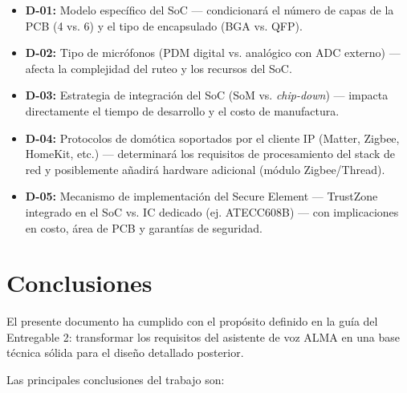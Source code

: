 \documentclass[%
	paper=a4,
	twoside=false,
	parskip=half,
	chapterprefix=false,
	10pt,
	headings=normal,
	bibliography=totoc,
	listof=totoc,
	titlepage=on,
	captions=tableabove,
	draft=false,
]{scrbook}%
\begin{document}
\begin{itemize}
    \item \textbf{D-01:} Modelo específico del SoC — condicionará el número de capas de la PCB (4 vs. 6) y el tipo de encapsulado (BGA vs. QFP).
    \item \textbf{D-02:} Tipo de micrófonos (PDM digital vs. analógico con ADC externo) — afecta la complejidad del ruteo y los recursos del SoC.
    \item \textbf{D-03:} Estrategia de integración del SoC (SoM vs. \textit{chip-down}) — impacta directamente el tiempo de desarrollo y el costo de manufactura.
    \item \textbf{D-04:} Protocolos de domótica soportados por el cliente IP (Matter, Zigbee, HomeKit, etc.) — determinará los requisitos de procesamiento del stack de red y posiblemente añadirá hardware adicional (módulo Zigbee/Thread).
    \item \textbf{D-05:} Mecanismo de implementación del Secure Element — TrustZone integrado en el SoC vs. IC dedicado (ej. ATECC608B) — con implicaciones en costo, área de PCB y garantías de seguridad.
\end{itemize}

\chapter{Conclusiones}

El presente documento ha cumplido con el propósito definido en la guía del Entregable 2: transformar los requisitos del asistente de voz ALMA en una base técnica sólida para el diseño detallado posterior.

Las principales conclusiones del trabajo son:
\end{document}
